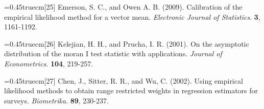 \documentclass[onecolumn]{ctexart}	%
\def\nh{\noindent\hangindent=0.45truecm\hangafter=1}
\begin{document}
\nh [25] Emerson, S. C., and Owen A. B. (2009). Calibration of the empirical likelihood method for a vector mean. \textit{Electronic Journal of Statistics}. \textbf{3}, 1161-1192. 

\nh [26] Kelejian, H. H., and Prucha, I. R. (2001). On the asymptotic distribution of the moran I test statistic with applications.\textit{ Journal of Econometrics}. \textbf{104}, 219-257.

\nh [27] Chen, J., Sitter, R. R., and Wu, C. (2002). Using empirical likelihood methods to obtain range restricted weights in regression estimators for surveys. \textit{Biometrika}. \textbf{89}, 230-237.


%
\end{document}
